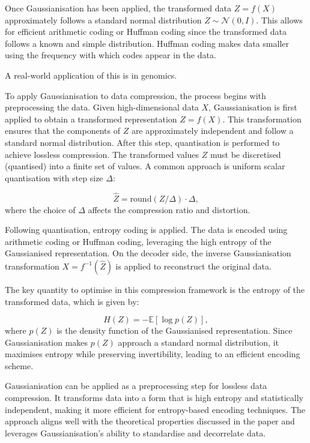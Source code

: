 Once Gaussianisation has been applied, the transformed data $Z = f(X)$ approximately follows a standard normal distribution $Z \sim \mathcal{N}(0, I)$. This allows for efficient arithmetic coding or Huffman coding since the transformed data follows a known and simple distribution. Huffman coding makes data smaller using the frequency with which codes appear in the data.\cite{BBC_Huffman_2025}

A real-world application of this is in genomics.


To apply Gaussianisation to data compression, the process begins with preprocessing the data. Given high-dimensional data $X$, Gaussianisation is first applied to obtain a transformed representation $Z = f(X)$. This transformation ensures that the components of $Z$ are approximately independent and follow a standard normal distribution. After this step, quantisation is performed to achieve lossless compression. The transformed values $Z$ must be discretised (quantised) into a finite set of values. A common approach is uniform scalar quantisation with step size $\Delta$:

\begin{equation}
\hat{Z} = \text{round}(Z / \Delta) \cdot \Delta,
\end{equation}
where the choice of $\Delta$ affects the compression ratio and distortion.

Following quantisation, entropy coding is applied. The data is encoded using arithmetic coding or Huffman coding, leveraging the high entropy of the Gaussianised representation. On the decoder side, the inverse Gaussianisation transformation $X = f^{-1}(\hat{Z})$ is applied to reconstruct the original data.

The key quantity to optimise in this compression framework is the entropy of the transformed data, which is given by:

\begin{equation}
H(Z) = - \mathbb{E} [\log p(Z)],
\end{equation}
\noindent where $p(Z)$ is the density function of the Gaussianised representation. Since Gaussianisation makes $p(Z)$ approach a standard normal distribution, it maximises entropy while preserving invertibility, leading to an efficient encoding scheme.

Gaussianisation can be applied as a preprocessing step for lossless data compression. It transforms data into a form that is high entropy and statistically independent, making it more efficient for entropy-based encoding techniques. The approach aligns well with the theoretical properties discussed in the paper and leverages Gaussianisation’s ability to standardise and decorrelate data.



